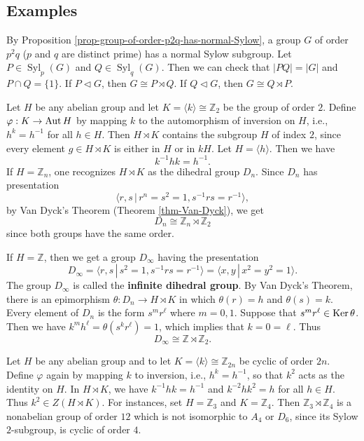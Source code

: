 \subsection{Examples}
\begin{example}
	By Proposition \ref{prop-group-of-order-p2q-has-normal-Sylow}, a group $G$ of order $p^2q$ ($p$ and $q$ are distinct prime) has a normal Sylow subgroup. Let $P\in\operatorname{Syl}_p(G)$ and $Q\in\operatorname{Syl}_q(G)$. Then we can check that $|PQ| = |G|$ and $P\cap Q = \{1\}$. If $P\lhd G$, then $G \cong P\rtimes Q$. If $Q\lhd G$, then $G \cong Q\rtimes P$.
\end{example}
\begin{example}
	 Let $H$ be any abelian group and let $K = \langle k \rangle \cong \mathbb{Z}_2$ be the group of order $2$. Define $\varphi : K \rightarrow \operatorname{Aut} H$ by
	 mapping $k$ to the automorphism of inversion on $H$, i.e.,  $h^k = h^{-1}$ for all $h \in H$. Then $H\rtimes K$ contains the subgroup $H$ of index $2$, since every element $g\in H\rtimes K$ is either in $H$ or in $kH$. Let $H = \langle h\rangle$. Then we have $$k^{-1}hk = h^{-1}.$$  If $H = \mathbb{Z}_n $, one recognizes $H\rtimes K$ as the dihedral group $D_{n}$. Since $D_n$ has presentation $$\langle r,s\,|\, r^n = s^2 = 1, s^{-1}rs= r^{-1}\rangle,$$ by  Van Dyck's Theorem (Theorem \ref{thm-Van-Dyck}), we get
	$$D_n \cong \mathbb{Z}_n\rtimes \mathbb{Z}_2$$
	since both groups have the same order.
	
	 If $H = \mathbb{Z}$, then we get a group  $D_{\infty}$ having the presentation
	 \begin{equation*}
	 	D_{\infty} = \langle r,s\,|\,  s^2 = 1, s^{-1}rs= r^{-1}\rangle  = \langle x,y \,|\, x^2 = y^2 = 1\rangle.
	 \end{equation*} The group $D_{\infty}$  is called the \textbf{infinite dihedral group}. By  Van Dyck's Theorem, there is an epimorphism $\theta:D_n\rightarrow H\rtimes K$ in which $\theta(r) =  h$ and $\theta(s)= k$. Every element of $D_n$ is the form $s^m r^\ell$ where $m=0, 1$. Suppose that $s^m r^\ell \in\operatorname{Ker} \theta$. Then  we have  $ k^m h^\ell = \theta(s^k r^\ell)= 1$, which implies that  $k=0=\ell$. Thus 
	 \begin{equation*}
	 	D_{\infty} \cong \mathbb{Z}\rtimes \mathbb{Z}_2.
	 \end{equation*} 
\end{example}




	
\begin{example}
 Let $H$ be any abelian group and to let $K = \langle k \rangle \cong \mathbb{Z}_{2n}$ be cyclic of order $2n$. Define $\varphi$ again by mapping $k$ to inversion, i.e., $h^k = h^{-1}$, so that $k^2$ acts as the identity on $H$. In $H\rtimes K$, we have $k^{-1}hk = h^{-1}$ and $k^{-2}hk^2 = h$ for all $h \in H$. Thus $k^2 \in Z(H\rtimes K)$. For instances, set $H = \mathbb{Z}_3$ and $K = \mathbb{Z}_4$. Then $\mathbb{Z}_3 \rtimes \mathbb{Z}_4$ is a nonabelian group of order $12$ which is not isomorphic to $A_4$ or $D_{6}$, since its Sylow $2$-subgroup,  is cyclic of order $4$.
 
 
\end{example}

